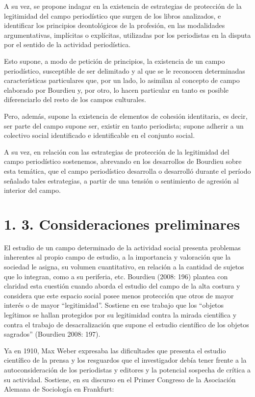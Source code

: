 {A su vez, se propone indagar en la existencia de estrategias de protección de la legitimidad del campo periodístico que surgen de los libros analizados, e identificar los principios deontológicos de la profesión, en las modalidades argumentativas, implícitas o explícitas, utilizadas por los periodistas en la disputa por el sentido de la actividad periodística.

Esto supone, a modo de petición de principios, la existencia de un campo periodístico, susceptible de ser delimitado y al que se le reconocen determinadas características particulares que, por un lado, lo asimilan al concepto de campo elaborado por Bourdieu y, por otro, lo hacen particular en tanto es posible diferenciarlo del resto de los campos culturales.

Pero, además, supone la existencia de elementos de cohesión identitaria, es decir, ser parte del campo supone ser, existir en tanto periodista; supone adherir a un colectivo social identificado e identificable en el conjunto social.

A su vez, en relación con las estrategias de protección de la legitimidad del campo periodístico sostenemos, abrevando en los desarrollos de Bourdieu sobre esta temática, que el campo periodístico desarrolla o desarrolló durante el período señalado tales estrategias, a partir de una tensión o sentimiento de agresión al interior del campo.

\section{1. 3. Consideraciones preliminares}

El estudio de un campo determinado de la actividad social presenta problemas inherentes al propio campo de estudio, a la importancia y valoración que la sociedad le asigna, su volumen cuantitativo, en relación a la cantidad de sujetos que lo integran, como a su periferia, etc. Bourdieu (2008: 196) plantea con claridad esta cuestión cuando aborda el estudio del campo de la alta costura y considera que este espacio social posee menos protección que otros de mayor interés o de mayor \enquote{legitimidad}. Sostiene en ese trabajo que los \enquote{objetos legítimos se hallan protegidos por su legitimidad contra la mirada científica y contra el trabajo de desacralización que supone el estudio científico de los objetos sagrados} (Bourdieu 2008: 197).

Ya en 1910, Max Weber expresaba las dificultades que presenta el estudio científico de la prensa y los resguardos que el investigador debía tener frente a la autoconsideración de los periodistas y editores y la potencial sospecha de crítica a su actividad. Sostiene, en su discurso en el Primer Congreso de la Asociación Alemana de Sociología en Frankfurt:

}

